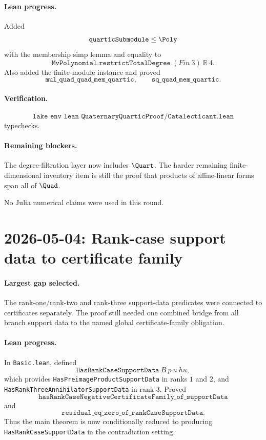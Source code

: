 \documentclass[11pt]{article}
\begin{document}
\paragraph{Lean progress.}
Added
\[
\texttt{quarticSubmodule}\le\Poly
\]
with the membership simp lemma and equality to
\[
\texttt{MvPolynomial.restrictTotalDegree}\ (Fin\ 3)\ \mathbb R\ 4.
\]
Also added the finite-module instance and proved
\[
\texttt{mul\_quad\_quad\_mem\_quartic},\qquad
\texttt{sq\_quad\_mem\_quartic}.
\]

\paragraph{Verification.}
\[
\texttt{lake env lean QuaternaryQuarticProof/Catalecticant.lean}
\]
typechecks.

\paragraph{Remaining blockers.}
The degree-filtration layer now includes \(\Quart\).  The harder remaining
finite-dimensional inventory item is still the proof that products of
affine-linear forms span all of \(\Quad\).

No Julia numerical claims were used in this round.

\section*{2026-05-04: Rank-case support data to certificate family}

\paragraph{Largest gap selected.}
The rank-one/rank-two and rank-three support-data predicates were connected
to certificates separately.  The proof still needed one combined bridge from
all branch support data to the named global certificate-family obligation.

\paragraph{Lean progress.}
In \texttt{Basic.lean}, defined
\[
\texttt{HasRankCaseSupportData}\ B\ p\ u\ hu,
\]
which provides \texttt{HasPreimageProductSupportData} in ranks \(1\) and
\(2\), and \texttt{HasRankThreeAnnihilatorSupportData} in rank \(3\).  Proved
\[
\texttt{hasRankCaseNegativeCertificateFamily\_of\_supportData}
\]
and
\[
\texttt{residual\_eq\_zero\_of\_rankCaseSupportData}.
\]
Thus the main theorem is now conditionally reduced to producing
\texttt{HasRankCaseSupportData} in the contradiction setting.
\end{document}
